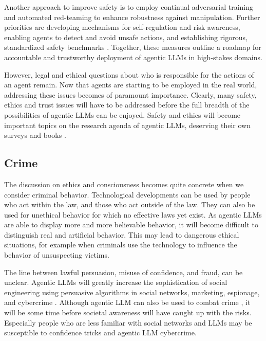 Another approach to improve safety is to employ continual adversarial training and automated red-teaming to enhance robustness against manipulation. Further priorities are developing mechanisms for self-regulation and risk awareness, enabling agents to detect and avoid unsafe actions, and establishing rigorous, standardized safety benchmarks \citep{andriushchenko2024agentharm}. Together, these measures outline a roadmap for accountable and trustworthy deployment of agentic LLMs in high-stakes domains. 

However, legal and ethical questions about who is responsible for the actions of an agent remain. Now that agents are starting to be employed in the real world, addressing these issues becomes of paramount importance. 
Clearly, many safety, ethics and trust issues
will have to be addressed before the full breadth of the possibilities
of agentic LLMs can be enjoyed.
Safety and ethics will become important topics on the research agenda of agentic LLMs, deserving their own surveys and books \citep{gan2024navigating,jiao2025navigating,raza2025responsible}.




\subsection{Crime}
The discussion on ethics and consciousness becomes quite concrete when we consider criminal behavior. Technological developments can be used by people who act within the law, and those who act outside of the law. They can also be used for unethical behavior for which no effective laws yet exist. 
As agentic LLMs are able to display more and more believable behavior, it will become difficult to distinguish real and artificial behavior. This may lead to dangerous ethical situations, for example when criminals use the technology to influence the behavior of unsuspecting victims.

The line between lawful persuasion, misuse of confidence, and fraud, can be unclear. 
Agentic LLMs will greatly increase the sophistication of social engineering using  persuasive algorithms in social networks, marketing, espionage, and cybercrime \citep{kshetri2025transforming,lupinacci2025dark}. Although agentic LLM can also be used to combat crime \citep{challita2025redteamllm,andriushchenko2024agentharm}, it will be some time before societal awareness will have caught up with the risks. %
Especially people who are less familiar with social networks and LLMs may be susceptible to confidence tricks and agentic LLM cybercrime. 


